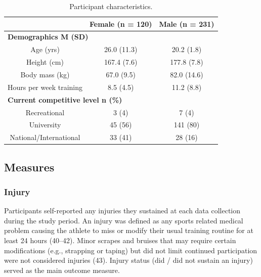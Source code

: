 \documentclass[
  english,
  man]{apa6}
\begin{document}
\begin{table}[H]

\caption{\label{tab:table1}Participant characteristics.}
\centering
\begin{tabular}[t]{c|c|c}
\hline
\textbf{ } & \textbf{Female (n = 120)} & \textbf{Male (n = 231)}\\
\hline
\multicolumn{3}{l}{\textbf{Demographics M (SD)}}\\
\hline
\hspace{1em}Age (yrs) & 26.0 (11.3) & 20.2 (1.8)\\
\hline
\hspace{1em}Height (cm) & 167.4 (7.6) & 177.8 (7.8)\\
\hline
\hspace{1em}Body mass (kg) & 67.0 (9.5) & 82.0 (14.6)\\
\hline
\hspace{1em}Hours per week training & 8.5 (4.5) & 11.2 (8.8)\\
\hline
\multicolumn{3}{l}{\textbf{Current competitive level n (\%)}}\\
\hline
\hspace{1em}Recreational & 3 (4) & 7 (4)\\
\hline
\hspace{1em}University & 45 (56) & 141 (80)\\
\hline
\hspace{1em}National/International & 33 (41) & 28 (16)\\
\hline
\end{tabular}
\end{table}

\hypertarget{measures}{%
\subsection{Measures}\label{measures}}

\hypertarget{injury}{%
\subsubsection{Injury}\label{injury}}

Participants self-reported any injuries they sustained at each data collection during the study period.
An injury was defined as any sports related medical problem causing the athlete to miss or modify their usual training routine for at least 24 hours (40--42).
Minor scrapes and bruises that may require certain modifications (e.g., strapping or taping) but did not limit continued participation were not considered injuries (43).
Injury status (did / did not sustain an injury) served as the main outcome measure.
\end{document}
